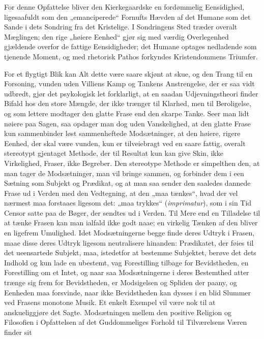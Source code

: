 \documentclass[12pt,a4paper,openany]{book}
\newcommand{\opage}[1]{\marginnote{\footnotesize\textit{[#1]}}}
\begin{document}
For denne Opfattelse bliver den Kierkegaardske en fordømmelig
Eensidighed, ligesaafuldt som den „emanciperede“
Fornufts Hævden af det Humane som det Sande i dets
Sondring fra det Kristelige. I Sondringens Sted træder
overalt Mæglingen; den rige „høiere Eenhed“ gjør sig med
værdig Overlegenhed gjældende overfor de fattige Eensidigheder;
det Humane optages nedladende som tjenende Moment,
og med rhetorisk Pathos forkyndes Kristendommens Triumfer.

For et flygtigt Blik kan Alt dette være saare skjønt at
skue, og den Trang til en Forsoning, vunden uden Villiens
Kamp og Tankens Anstrengelse, der er saa vidt udbredt, gjør
det psykologisk let forklarligt, at en saadan Udjevningstheori
finder Bifald hos den store Mængde, der ikke trænger til
Klarhed, men til Beroligelse, og som lettere modtager den
glatte Frase end den skarpe Tanke. Seer man lidt nøiere
paa Sagen, saa opdager man dog uden Vanskelighed, at den
\opage{440}glatte Frase kun sammenbinder løst sammenheftede Modsætninger,
at den høiere, rigere Eenhed, der skal være vunden,
kun er tilveiebragt ved en saare fattig, overalt stereotypt
gjentaget Methode, der til Resultat kun kan give Skin, ikke
Virkelighed, Fraser, ikke Begreber. Den stereotype Methode
er simpelthen den, at man tager de Modsætninger, man vil
bringe sammen, og forbinder dem i een Sætning som Subjekt
og Prædikat, og at man saa sender den saaledes dannede Frase
ud i Verden med den Vedtegning, at den „maa tænkes“, hvad
der vel nærmest maa forstaaes ligesom det: „maa trykkes“
(\textit{imprimatur}), som i sin Tid Censor satte paa de Bøger, der
sendtes ud i Verden. Til Mere end en Tilladelse til at tænke
Frasen kan man ialfald ikke godt naae; en virkelig Tænken af
den bliver en ligefrem Umulighed. Idet Modsætningerne begge
finde deres Udtryk i Frasen, maae disse deres Udtryk ligesom
neutralisere hinanden: Prædikatet, der føies til det ueensartede
Subjekt, maa, istedetfor at bestemme Subjektet, berøve det
dets Indhold og kun lade en ubestemt, vag Forestilling tilbage
for Bevidstheden, en Forestilling om et Intet, og naar
saa Modsætningerne i deres Bestemthed atter trænge sig frem
for Bevidstheden, er Modsigelsen og Spliden der paany, og
Eenheden maa forsvinde, naar ikke Bevidstheden kan dysses i
en blid Slummer ved Frasens monotone Musik. Et enkelt
Exempel vil være nok til at anskueliggjøre det Sagte. Modsætningen
mellem den positive Religion og Filosofien i Opfattelsen
af det Guddommeliges Forhold til Tilværelsens Væren finder sit
\end{document}
